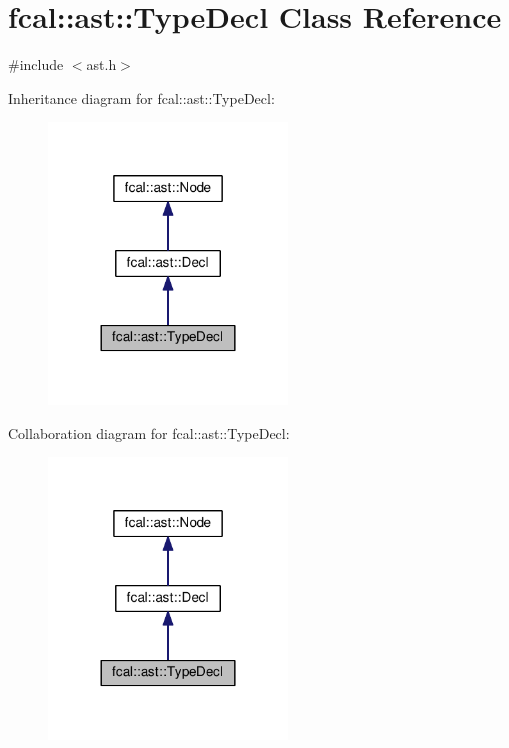 \hypertarget{classfcal_1_1ast_1_1TypeDecl}{}\section{fcal\+:\+:ast\+:\+:Type\+Decl Class Reference}
\label{classfcal_1_1ast_1_1TypeDecl}


{\ttfamily \#include $<$ast.\+h$>$}



Inheritance diagram for fcal\+:\+:ast\+:\+:Type\+Decl\+:
\nopagebreak
\begin{figure}[H]
\begin{center}
\leavevmode
\includegraphics[width=180pt]{classfcal_1_1ast_1_1TypeDecl__inherit__graph}
\end{center}
\end{figure}


Collaboration diagram for fcal\+:\+:ast\+:\+:Type\+Decl\+:
\nopagebreak
\begin{figure}[H]
\begin{center}
\leavevmode
\includegraphics[width=180pt]{classfcal_1_1ast_1_1TypeDecl__coll__graph}
\end{center}
\end{figure}

